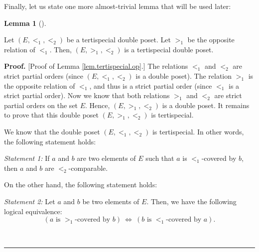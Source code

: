 \documentclass[numbers=enddot,12pt,final,onecolumn,notitlepage,abstracton]{scrartcl}
\theoremstyle{definition}
\newtheorem{lem}[theo]{Lemma}
\newenvironment{lemma}[1][]
{\begin{lem}[#1]\begin{leftbar}}
{\end{leftbar}\end{lem}}
\newenvironment{proof}[1][Proof]{\noindent\textbf{#1.} }{\ \rule{0.5em}{0.5em}}
\newenvironment{verlong}{}{}
\begin{document}
\begin{verlong}
Finally, let us state one more almost-trivial lemma that will
be used later:

\begin{lemma}
\label{lem.tertispecial.op}
Let $\left(  E,<_{1},<_{2}\right)  $ be a
tertispecial double poset. Let $>_{1}$ be the opposite relation of $<_{1}$.
Then, $\left(  E,>_{1},<_{2}\right)  $ is a tertispecial double poset.
\end{lemma}

\begin{proof}
[Proof of Lemma \ref{lem.tertispecial.op}.] The relations $<_{1}$ and $<_{2}$
are strict partial orders (since $\left(  E,<_{1},<_{2}\right)  $ is a double
poset). The relation $>_{1}$ is the opposite relation of $<_{1}$, and thus is
a strict partial order (since $<_{1}$ is a strict partial order). Now we know
that both relations $>_{1}$ and $<_{2}$ are strict partial orders on the set
$E$. Hence, $\left(  E,>_{1},<_{2}\right)  $ is a double poset. It remains to
prove that this double poset $\left(  E,>_{1},<_{2}\right)  $ is tertispecial.

We know that the double poset $\left(  E,<_{1},<_{2}\right)  $ is
tertispecial. In other words, the following statement holds:

\textit{Statement 1:} If $a$ and $b$ are two elements of $E$ such that $a$ is
$<_{1}$-covered by $b$, then $a$ and $b$ are $<_{2}$-comparable.

On the other hand, the following statement holds:

\textit{Statement 2:} Let $a$ and $b$ be two elements of $E$. Then, we have
the following logical equivalence:%
\[
\left(  a\text{ is }>_{1}\text{-covered by }b\right)  \ \Longleftrightarrow
\ \left(  b\text{ is }<_{1}\text{-covered by }a\right)  .
\]



\end{proof}
\end{verlong}
\end{document}
